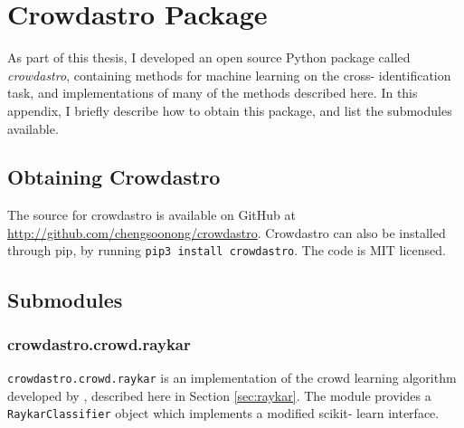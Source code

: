 
\appendix
\chapter{Crowdastro Package}

As part of this thesis, I developed an open source Python package called
\emph{crowdastro}, containing methods for machine learning on the cross-
identification task, and implementations of many of the methods described here.
In this appendix, I briefly describe how to obtain this package, and list the
submodules available.

\section{Obtaining Crowdastro}

    The source for crowdastro is available on GitHub at
    \url{http://github.com/chengsoonong/crowdastro}. Crowdastro can also be
    installed through pip, by running \texttt{pip3 install crowdastro}. The code
    is MIT licensed.

\section{Submodules}
    \label{sec:crowdastro-submodules}


    \subsection{crowdastro.crowd.raykar}
        \label{sec:crowdastro-raykar}

        \texttt{crowdastro.crowd.raykar} is an implementation of the crowd
        learning algorithm developed by \citet{raykar10}, described here in
        Section \ref{sec:raykar}. The module provides a
        \texttt{RaykarClassifier} object which implements a modified scikit-
        learn interface.
